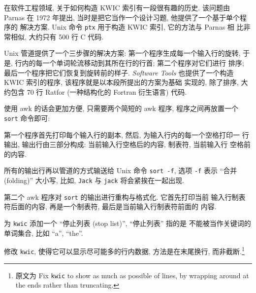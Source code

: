 在软件工程领域, 关于如何构造 KWIC 索引有一段很有趣的历史. 该问题由 Parnas
在 1972 年提出, 当时是把它当作一个设计习题, 他提供了一个基于单个程序的
解决方案. Unix 命令 \texttt{ptx} 用于构造 KWIC 索引, 它的方法与 Parnas 相
比非常相似, 大约只有 500 行 C 代码.

Unix 管道提供了一个三步骤的解决方案: 第一个程序生成每一个输入行的旋转,
于是, 行内的每一个单词轮流移动到其所在行的行首; 第二个程序对它们进行
排序; 最后一个程序把它们恢复到旋转前的样子. \textit{Software Tools}
也提供了一个构造 KWIC 索引的程序, 该程序就是以本段所提出的方案为基础
实现的, 除了排序, 大约包含 70 行 Ratfor (一种结构化的 Fortran 衍生语言)
代码.

使用 awk 的话会更加方便, 只需要两个简短的 awk 程序, 程序之间再放置一个
\texttt{sort} 命令即可:
第一个程序首先打印每个输入行的副本, 然后, 为输入行内的每一个空格打印一
行输出, 输出行由三部分构成: 当前输入行空格后的内容, 制表符, 当前输入行%
%
空格前的内容.

所有的输出行再以管道的方式输送给 Unix 命令 \texttt{sort -f}, 选项
\texttt{-f} 表示 ``合并 (folding)'' 大小写, 比如, \texttt{Jack} 与
\texttt{jack} 将会紧挨在一起出现.

第二个 awk 程序对 \texttt{sort} 的输出进行重构与格式化. 它首先打印当前
输入行制表符后面的内容, 再是一个制表符, 最后是当前输入行制表符前面的
内容.

\begin{exercise}
    \label{exer:stop_list}
    为 \texttt{kwic} 添加一个 ``停止列表 (stop list)'', ``停止列表'' 指的是
    不能被当作关键词的单词集合, 比如 ``a'', ``the''.
\end{exercise}

\begin{exercise}
    修改 \texttt{kwic}, 使得它可以显示尽可能多的行内数据, 方法是在末尾换行,
    而非截断.\footnote{原文为 Fix \texttt{kwic} to show as much as possible
    of lines, by wrapping around at the ends rather than truncating.}
\end{exercise}

